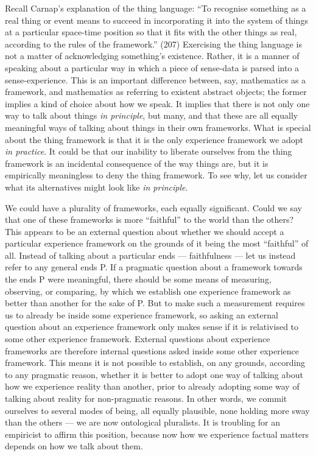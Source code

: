 \documentclass[12pt]{article}
\begin{document}
Recall Carnap's explanation of  the thing language: ``To recognise something as a real thing or event means to succeed in incorporating it into the system of things at a particular space-time position so that it fits with the other things as real, according to the rules of the framework.'' (207) Exercising the thing language is not a matter of acknowledging something's existence. Rather, it is a manner of speaking about a particular way in which a piece of sense-data is parsed into a sense-experience. This is an important difference between, say, mathematics as a framework, and mathematics as referring to existent abstract objects; the former implies a kind of choice about how we speak. It implies that there is not only one way to talk about things \textit{in principle}, but many, and that these are all equally meaningful ways of talking about things in their own frameworks. What is special about the thing framework is that it is the only experience framework we adopt \textit{in practice}. It could be that our inability to liberate ourselves from the thing framework is an incidental consequence of the way things are, but it is empirically meaningless to deny the thing framework. To see why, let us consider what its alternatives might look like \textit{in principle}.

We could have a plurality of frameworks, each equally significant. Could we say that one of these frameworks is more ``faithful'' to the world than the others? This appears to be an external question about whether we should accept a particular experience framework on the grounds of it being the most ``faithful'' of all. Instead of talking about a particular ends --- faithfulness --- let us instead refer to any general ends P. If a pragmatic question about a framework towards the ends P were meaningful, there should be some means of measuring, observing, or comparing, by which we establish one experience framework as better than another for the sake of P. But to make such a measurement requires us to already be inside some experience framework, so asking an external question about an experience framework only makes sense if it is relativised to some other experience framework. External questions about experience frameworks are therefore internal questions asked inside some other experience framework. This means it is not possible to establish, on any grounds, according to any pragmatic reason, whether it is better to adopt one way of talking about how we experience reality than another, prior to already adopting some way of talking about reality for non-pragmatic reasons. In other words, we commit ourselves to several modes of being, all equally plausible, none holding more sway than the others --- we are now ontological pluralists. It is troubling for an empiricist to affirm this position, because now how we experience factual matters depends on how we talk about them. 
\end{document}

